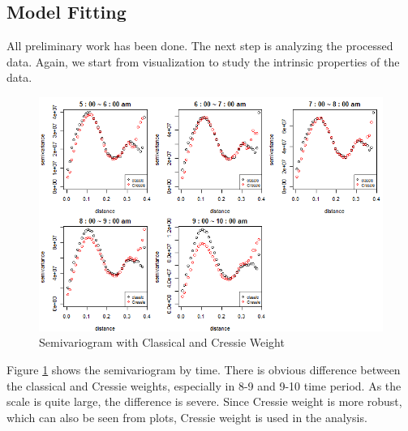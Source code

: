 \documentclass[hidelinks,12pt]{article}
\begin{document}
	\subsection{Model Fitting} \label{sec:resfit}
	All preliminary work has been done. The next step is analyzing the processed data. Again, we start from visualization to study the intrinsic properties of the data.
	\begin{figure}[!ht]
		\includegraphics[width=\textwidth]{semi.png}
		\caption{Semivariogram with Classical and Cressie Weight \label{fig:semi}}
	\end{figure}
\FloatBarrier
	Figure \ref{fig:semi} shows the semivariogram by time. There is obvious difference between the classical and Cressie weights, especially in 8-9 and 9-10 time period. As the scale is quite large, the difference is severe. Since Cressie weight is more robust, which can also be seen from plots, Cressie weight is used in the analysis.
	
\end{document}
